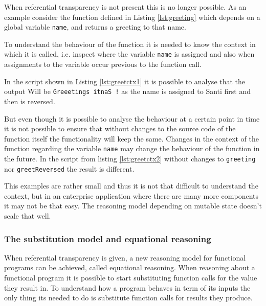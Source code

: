 \documentclass[../main.tex]{subfiles}
\begin{document}
When referential transparency is not present this is no longer possible. As an
example consider the function defined in Listing \ref{lst:greeting} which
depends on a global variable \texttt{name}, and returns a greeting to that name.



To understand the behaviour of the function it is needed to know the context in
which it is called, i.e. inspect where the variable \texttt{name} is assigned
and also when assignments to the variable occur previous to the function call.

In the script shown in Listing \ref{lst:greetctx1} it is possible to analyse
that the output Will be \texttt{Greeetings itnaS !} as the name is assigned
to Santi first and then is reversed.



But even though it is possible to analyse the behaviour at a certain point in
time it is not possible to ensure that without changes to the source code of the
function itself the functionality will keep the same. Changes in the context
of the function regarding the variable \texttt{name} may change the behaviour of
the function in the future. In the script from listing \ref{lst:greetctx2}
without changes to \texttt{greeting} nor \texttt{greetReversed} the result is different.



This examples are rather small and thus it is not that difficult to understand
the context, but in an enterprise application where there are many more
components it may not be that easy. The reasoning model depending on mutable
state doesn't scale that well.

\subsubsection{The substitution model and equational reasoning}

When referential transparency is given, a new reasoning model for functional
programs can be achieved, called equational reasoning. When reasoning about a
functional program it is possible to start substituting function calls for the
value they result in. To understand how a program behaves in term of its inputs
the only thing its needed to do is substitute function calls for results they
produce.
\end{document}
